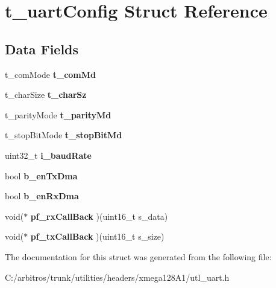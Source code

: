 \hypertarget{structt__uart_config}{\section{t\-\_\-uart\-Config Struct Reference}
\label{structt__uart_config}
}
\subsection*{Data Fields}
\begin{DoxyCompactItemize}
\item 
\hypertarget{structt__uart_config_ac20342fe1c3da5b26c8bcf3fb9021bb8}{t\-\_\-com\-Mode {\bfseries t\-\_\-com\-Md}}\label{structt__uart_config_ac20342fe1c3da5b26c8bcf3fb9021bb8}

\item 
\hypertarget{structt__uart_config_a48763c20afa10fad3816a77cd373eb7b}{t\-\_\-char\-Size {\bfseries t\-\_\-char\-Sz}}\label{structt__uart_config_a48763c20afa10fad3816a77cd373eb7b}

\item 
\hypertarget{structt__uart_config_aa810a46cf1c4d75c5f091a361e95a50b}{t\-\_\-parity\-Mode {\bfseries t\-\_\-parity\-Md}}\label{structt__uart_config_aa810a46cf1c4d75c5f091a361e95a50b}

\item 
\hypertarget{structt__uart_config_a1a3c84df75a9f48811531dfa7109eeb4}{t\-\_\-stop\-Bit\-Mode {\bfseries t\-\_\-stop\-Bit\-Md}}\label{structt__uart_config_a1a3c84df75a9f48811531dfa7109eeb4}

\item 
\hypertarget{structt__uart_config_ac316d01a82a05edc681fdfe0bac24060}{uint32\-\_\-t {\bfseries i\-\_\-baud\-Rate}}\label{structt__uart_config_ac316d01a82a05edc681fdfe0bac24060}

\item 
\hypertarget{structt__uart_config_a1e16fa7710803c2aca88c4c0cefc0838}{bool {\bfseries b\-\_\-en\-Tx\-Dma}}\label{structt__uart_config_a1e16fa7710803c2aca88c4c0cefc0838}

\item 
\hypertarget{structt__uart_config_a596bd9ae4f726f1721861bf5504949d4}{bool {\bfseries b\-\_\-en\-Rx\-Dma}}\label{structt__uart_config_a596bd9ae4f726f1721861bf5504949d4}

\item 
\hypertarget{structt__uart_config_a4ffd88bed41f1da8921e72accab66d34}{void($\ast$ {\bfseries pf\-\_\-rx\-Call\-Back} )(uint16\-\_\-t s\-\_\-data)}\label{structt__uart_config_a4ffd88bed41f1da8921e72accab66d34}

\item 
\hypertarget{structt__uart_config_a918a799f0692184162f4c5dbe8e893f0}{void($\ast$ {\bfseries pf\-\_\-tx\-Call\-Back} )(uint16\-\_\-t s\-\_\-size)}\label{structt__uart_config_a918a799f0692184162f4c5dbe8e893f0}

\end{DoxyCompactItemize}


The documentation for this struct was generated from the following file\-:\begin{DoxyCompactItemize}
\item 
C\-:/arbitros/trunk/utilities/headers/xmega128\-A1/utl\-\_\-uart.\-h\end{DoxyCompactItemize}
